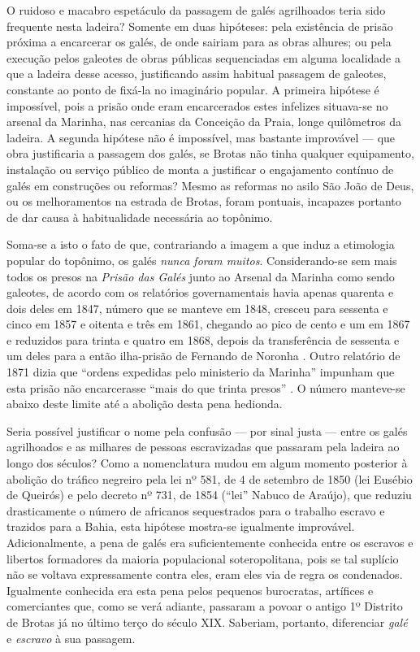 O ruidoso e macabro espetáculo da passagem de galés agrilhoados teria sido frequente nesta ladeira? Somente em duas hipóteses: pela existência de prisão próxima a encarcerar os galés, de onde sairiam para as obras alhures; ou pela execução pelos galeotes de obras públicas sequenciadas em alguma localidade a que a ladeira desse acesso, justificando assim habitual passagem de galeotes, constante ao ponto de fixá-la no imaginário popular. A primeira hipótese é impossível, pois a prisão onde eram encarcerados estes infelizes situava-se no arsenal da Marinha, nas cercanias da Conceição da Praia, longe quilômetros da ladeira. A segunda hipótese não é impossível, mas bastante improvável --- que obra justificaria a passagem dos galés, se Brotas não tinha qualquer equipamento, instalação ou serviço público de monta a justificar o engajamento contínuo de galés em construções ou reformas? Mesmo as reformas no asilo São João de Deus, ou os melhoramentos na estrada de Brotas, foram pontuais, incapazes portanto de dar causa à habitualidade necessária ao topônimo.

Soma-se a isto o fato de que, contrariando a imagem a que induz a etimologia  popular do topônimo, os galés \textit{nunca foram muitos}. Considerando-se sem mais todos os presos na \textit{Prisão das Galés} junto ao Arsenal da Marinha como sendo galeotes, de acordo com os relatórios governamentais havia apenas quarenta e dois deles em 1847, número que se manteve em 1848, cresceu para sessenta e cinco em 1857 e oitenta e três em 1861, chegando ao pico de cento e um em 1867 e reduzidos para trinta e quatro em 1868, depois da transferência de sessenta e um deles para a então ilha-prisão de Fernando de Noronha \cite{bahia_rpe_1847, bahia_rpe_1848, bahia_rpe_1857, bahia_rpe_1861, bahia_rpe_1869, bahia_rpe_1870}. Outro relatório de 1871 dizia que ``ordens expedidas pelo ministerio da Marinha'' impunham que esta prisão não encarcerasse ``mais do que trinta presos'' \cite[p.~18]{bahia_rpe_1871b}. O número manteve-se abaixo deste limite até a abolição desta pena hedionda.

Seria possível justificar o nome pela confusão --- por sinal justa --- entre os galés agrilhoados e as milhares de pessoas escravizadas que passaram pela ladeira ao longo dos séculos? Como a nomenclatura mudou em algum momento posterior à abolição do tráfico negreiro pela lei nº 581, de 4 de setembro de 1850 (lei Eusébio de Queirós) e pelo decreto nº 731, de 1854 (``lei'' Nabuco de Araújo), que reduziu drasticamente o número de africanos sequestrados para o trabalho escravo e trazidos para a Bahia, esta hipótese mostra-se igualmente improvável. Adicionalmente, a pena de galés era suficientemente conhecida entre os escravos e libertos formadores da maioria populacional soteropolitana, pois se tal suplício não se voltava expressamente contra eles, eram eles via de regra os condenados. Igualmente conhecida era esta pena pelos pequenos burocratas, artífices e comerciantes que, como se verá adiante, passaram a povoar o antigo 1º Distrito de Brotas já no último terço do século XIX. Saberiam, portanto, diferenciar \textit{galé} e \textit{escravo} à sua passagem.

